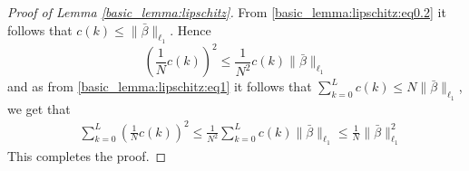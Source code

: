 \documentclass[10pt,a4paper]{amsart}
\begin{document}
\begin{proof}[Proof of Lemma \ref{basic_lemma:lipschitz}]
        From \eqref{basic_lemma:lipschitz:eq0.2}
        it follows that
        $c(k) \le \|\bar{\beta}\|_{\ell_1}$.
        Hence
        \[
         \left(\frac{1}{N} c(k)\right)^2 \le \frac{1}{N^2} c(k)  \|\bar{\beta}\|_{\ell_1}
        \]
        and as from \eqref{basic_lemma:lipschitz:eq1} it follows that $\sum_{k=0}^{L} c(k) \le N \|\bar{\beta}\|_{\ell_1}$, we get that 
        \begin{align*}
        & \sum_{k=0}^{L} \left(\frac{1}{N} c(k)\right)^2 \le 
        \frac{1}{N^2} \sum_{k=0}^{L}  c(k)
        \|\bar{\beta}\|_{\ell_1} \le 
        \frac{1}{N} \|\bar{\beta}\|_{\ell_1}^2
      \end{align*}
      This completes the proof.
    \end{proof}
\end{document}

